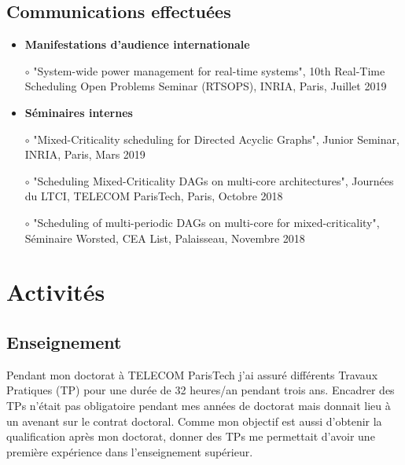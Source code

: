 \documentclass{article}
\begin{document}
\subsection{Communications effectuées}

\begin{itemize}
	\item \textbf{Manifestations d'audience internationale}
	
	$\circ$ "System-wide power management for real-time systems", 10th Real-Time Scheduling Open 
	Problems Seminar (RTSOPS), INRIA, Paris, Juillet 2019
	
	\item \textbf{Séminaires internes}
	
	$\circ$ "Mixed-Criticality scheduling for
	Directed Acyclic Graphs", Junior Seminar, INRIA, Paris, Mars 
	2019
	
	$\circ$ "Scheduling Mixed-Criticality DAGs on multi-core
architectures", Journées du LTCI, TELECOM 
	ParisTech, Paris, Octobre 2018
	
	$\circ$ "Scheduling of multi-periodic DAGs on multi-core for mixed-criticality", Séminaire Worsted, CEA 
	List, Palaisseau, Novembre 2018
\end{itemize}


\section{Activités}


\subsection{Enseignement}

Pendant mon doctorat à TELECOM ParisTech j'ai assuré différents Travaux Pratiques (TP) pour une durée de 
32 heures/an pendant trois ans. Encadrer des TPs n'était pas obligatoire pendant mes années de doctorat 
mais donnait lieu à un avenant sur le contrat doctoral. Comme mon objectif est aussi d'obtenir la qualification 
après mon doctorat, donner des TPs me permettait d'avoir une première expérience dans l'enseignement 
supérieur.
\vspace{.5cm}
\end{document}
